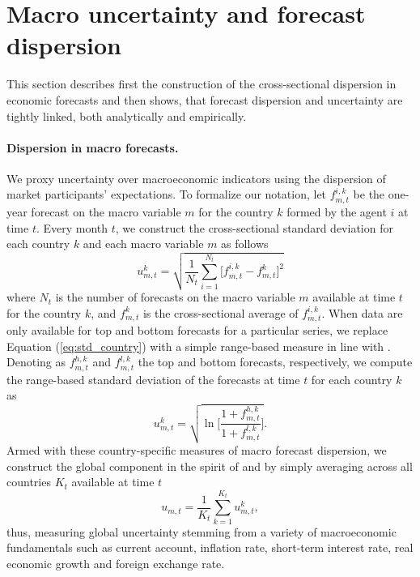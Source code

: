 \section{Macro uncertainty and forecast dispersion} \label{sec:prelim_analysis_UNC_CAR}
This section describes first the construction of the cross-sectional dispersion in economic forecasts and then shows, that forecast dispersion and uncertainty are tightly linked, both analytically and empirically.

\paragraph{Dispersion in macro forecasts.}
We proxy uncertainty over macroeconomic indicators using the dispersion of market participants' expectations. To formalize our notation, let $f_{m,t}^{i,k}$ be the one-year forecast on the macro variable $m$ for the country $k$ formed by the agent $i$ at time $t$. Every month $t$, we construct the cross-sectional standard deviation for each country $k$ and each macro variable $m$ as follows
\begin{equation} \label{eq:std_country}
u_{m,t}^{k} = \sqrt{ \displaystyle \frac{1}{N_t} \sum_{i=1}^{N_t} \Bigg[ f_{m,t}^{i,k}- f_{m,t}^{k} \Bigg]^2}
\end{equation}
where $N_t$ is the number of forecasts on the macro variable $m$ available at time $t$ for the country $k$, and $f_{m,t}^{k}$ is the cross-sectional average of $f_{m,t}^{i,k}$. When data are only available for top and bottom forecasts for a particular series, we replace Equation (\ref{eq:std_country}) with a simple range-based measure in line with \citet{Bali:2014}. Denoting as $f_{m,t}^{h,k}$ and $f_{m,t}^{l,k}$ the top and bottom forecasts, respectively, we compute the range-based standard deviation of the forecasts at time $t$ for each country $k$ as
\begin{equation} \label{eq:topbot_country}
u_{m,t}^{k} =\sqrt{\ln \Bigg[ \frac{ 1 + f_{m,t}^{h,k} }{ 1 + f_{m,t}^{l,k}} \Bigg]}.
\end{equation}
Armed with these country-specific measures of macro forecast dispersion, we construct the global component in the spirit of \citet{buraschi_etal2014} and \citet{menkhoff_etal2012} by simply averaging across all countries $K_{t}$ available at time $t$
\begin{equation} \label{eq:std_aggr}
u_{m,t} =\frac{1}{K_{t}} \displaystyle \sum_{k=1}^{K_t} u_{m,t}^k,
\end{equation}
thus, measuring global uncertainty stemming from a variety of macroeconomic fundamentals such as current account, inflation rate, short-term interest rate, real economic growth and foreign exchange rate.

